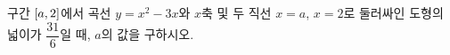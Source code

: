 구간 $[a{,}\mkern3mu\mathopen{}2]$에서 곡선 $y=x^2-3x$와 $x$축 및 두 직선 $x=a$, $x=2$로 둘러싸인 도형의 넓이가 $\dfrac{31}{6}$일 때, $a$의 값을 구하시오. 
